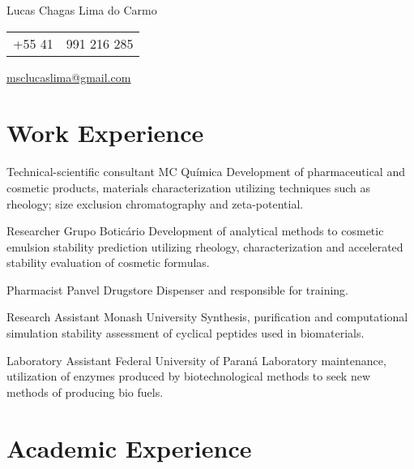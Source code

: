 \pagestyle{fancy} %
\fancyhf{} 
\renewcommand{\headrulewidth}{0pt}

\thispagestyle{empty}
\begin{center}
	{\huge Lucas Chagas Lima do Carmo}
	
	\vspace{6pt}
	
	\begin{tabular}{c|l}
		\arrayrulecolor{Accent}
		+55 41 & 991 216 285
	\end{tabular}
	
	\vspace{6pt}
	
	\textcolor{Accent}{\underline{\href{mailto:msclucaslima@gmail.com}{msclucaslima@gmail.com}}}
	
	\vspace{12pt}
\end{center}





\section{Work Experience}

{Technical-scientific consultant}
{MC Química}
{Development of pharmaceutical and cosmetic products, 
materials characterization utilizing techniques such as rheology;
size exclusion chromatography and zeta-potential.}

{Researcher}
{Grupo Boticário}
{Development of analytical methods to cosmetic emulsion 
stability prediction utilizing rheology,
characterization and accelerated stability evaluation 
of cosmetic formulas.}

{Pharmacist}
{Panvel Drugstore}
{Dispenser and responsible for training.}

{Research Assistant}
{Monash University}
{Synthesis, purification and computational simulation stability assessment
of cyclical peptides used in biomaterials.}

{Laboratory Assistant}
{Federal University of Paraná}
{Laboratory maintenance, 
utilization of enzymes produced by biotechnological methods
to seek new methods of producing bio fuels.}

\section{Academic Experience}

